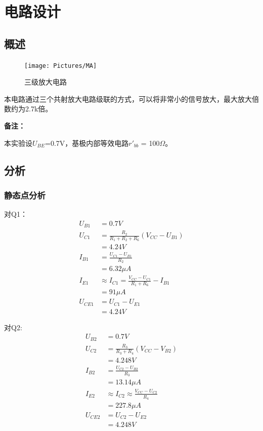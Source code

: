 \documentclass[11pt,a4paper,UTF8]{ctexart}
\begin{document}
		\section{电路设计}
		\subsection{概述}
		\begin{figure}[H]
			\centering
			\texttt{[image: Pictures/MA]}
			\caption{三级放大电路}
			\label{fig:mafreq}
		\end{figure}
		
		本电路通过三个共射放大电路级联的方式，可以将非常小的信号放大，最大放大倍数约为2.7k倍。
		
		\textbf{备注：}
		
		本实验设$ U_{BE} $=0.7V，基极内部等效电路$ r'_{bb} $ = 100$ \Omega $。
		
		\subsection{分析}
			\subsubsection{静态点分析}
			对Q1：
			\begin{align}
				U_{B1} &= 0.7V \nonumber\\
				U_{C1} &= \frac{R_2}{R_1+R_2+R_6}(V_{CC}-U_{B1}) \nonumber\\
				&= 4.24V \nonumber\\
				I_{B1} &= \frac{U_{C1}-U_{B1}}{R_2} \nonumber\\
				&= 6.32\mu{}A \nonumber\\
				I_{E1} &\approx I_{C1} = \frac{V_{CC}-U_{C1}}{R_1+R_6}-I_{B1} \nonumber\\
				&= 91\mu{}A \nonumber\\
				U_{CE1} &= U_{C1} - U_{E1} \nonumber\\
				&= 4.24V \nonumber
			\end{align}
			
			对Q2:
			\begin{align}
				U_{B2} &= 0.7V \nonumber\\
				U_{C2} &= \frac{R_3}{R_3+R_4}(V_{CC} - V_{B2}) \nonumber\\
				&= 4.248V \nonumber\\
				I_{B2} &= \frac{U_{C2} - U_{B2}}{R_3} \nonumber\\
				&= 13.14\mu{}A \nonumber\\
				I_{E2} &\approx I_{C2} \approx \frac{V_{CC}-U_{C2}}{R_4} \nonumber\\
				&= 227.8\mu{}A \nonumber\\
				U_{CE2} &= U_{C2} - U_{E2} \nonumber\\
				&= 4.248V \nonumber
			\end{align}
			
\end{document}
